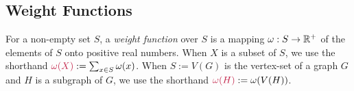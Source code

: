 \documentclass{patmorin}
\makeatletter
\newcommand{\pat}[1]{\noindent\textcolor{Magenta}{PaMo: #1}}
\newcommand{\gwen}[1]{\noindent\textcolor{Purple}{GJ: #1}}
\newcommand{\defin}[1]{\emph{\textcolor{brightmaroon}{#1}}}
\def\mathcolor#1#{\@mathcolor{#1}}
\def\@mathcolor#1#2#3{%
  \protect\leavevmode
  \begingroup
    \color#1{#2}#3%
  \endgroup
}
\newcommand{\mathdefin}[1]{\mathcolor{brightmaroon}{#1}}
\newcommand{\calF}{\mathcal{F}}
\newcommand{\calT}{\mathcal{T}}
\makeatother
\begin{document}









  \subsection{Weight Functions}

  For a non-empty set $S$, a \defin{weight function} over $S$ is a mapping $\omega:S\to\mathbb{R}^+$ of the elements of $S$ onto positive real numbers.  When $X$ is a subset of $S$, we use the shorthand $\mathdefin{\omega(X)}:=\sum_{x\in S}\omega(x)$.  When $S:=V(G)$ is the vertex-set of a graph $G$ and $H$ is a subgraph of $G$, we use the shorthand $\mathdefin{\omega(H)}:=\omega(V(H))$.
\end{document}
